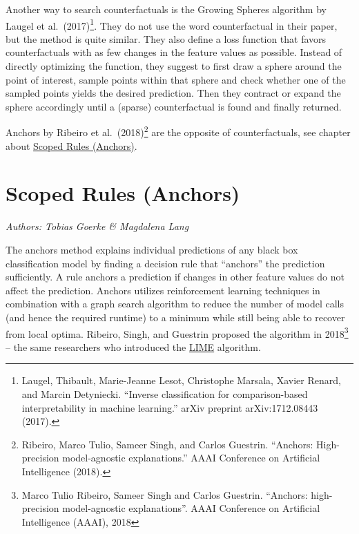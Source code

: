 \documentclass[
  11pt,
]{scrbook}
\begin{document}
Another way to search counterfactuals is the Growing Spheres algorithm by Laugel et al.~(2017)\footnote{Laugel, Thibault, Marie-Jeanne Lesot, Christophe Marsala, Xavier Renard, and Marcin Detyniecki. ``Inverse classification for comparison-based interpretability in machine learning.'' arXiv preprint arXiv:1712.08443 (2017).}.
They do not use the word counterfactual in their paper, but the method is quite similar.
They also define a loss function that favors counterfactuals with as few changes in the feature values as possible.
Instead of directly optimizing the function, they suggest to first draw a sphere around the point of interest, sample points within that sphere and check whether one of the sampled points yields the desired prediction.
Then they contract or expand the sphere accordingly until a (sparse) counterfactual is found and finally returned.

Anchors by Ribeiro et al.~(2018)\footnote{Ribeiro, Marco Tulio, Sameer Singh, and Carlos Guestrin. ``Anchors: High-precision model-agnostic explanations.'' AAAI Conference on Artificial Intelligence (2018).} are the opposite of counterfactuals, see chapter about \protect\hyperlink{anchors}{Scoped Rules (Anchors)}.

\newpage

\hypertarget{anchors}{%
\section{Scoped Rules (Anchors)}\label{anchors}}

\emph{Authors: Tobias Goerke \& Magdalena Lang}

The anchors method explains individual predictions of any black box classification model by finding a decision rule that ``anchors'' the prediction sufficiently.
A rule anchors a prediction if changes in other feature values do not affect the prediction.
Anchors utilizes reinforcement learning techniques in combination with a graph search algorithm to reduce the number of model calls (and hence the required runtime) to a minimum while still being able to recover from local optima. Ribeiro, Singh, and Guestrin proposed the algorithm in 2018\footnote{Marco Tulio Ribeiro, Sameer Singh and Carlos Guestrin. ``Anchors: high-precision model-agnostic explanations''. AAAI Conference on Artificial Intelligence (AAAI), 2018} -- the same researchers who introduced the \protect\hyperlink{lime}{LIME} algorithm.
\end{document}
